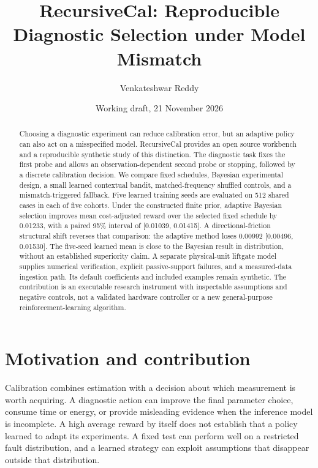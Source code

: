 \documentclass[
  10pt,
]{article}
\title{RecursiveCal: Reproducible Diagnostic Selection under Model
Mismatch}
\author{Venkateshwar Reddy}
\date{Working draft, 21 November 2026}
\begin{document}
\maketitle
\begin{abstract}
Choosing a diagnostic experiment can reduce calibration error, but an
adaptive policy can also act on a misspecified model. RecursiveCal
provides an open source workbench and a reproducible synthetic study of
this distinction. The diagnostic task fixes the first probe and allows
an observation-dependent second probe or stopping, followed by a
discrete calibration decision. We compare fixed schedules, Bayesian
experimental design, a small learned contextual bandit,
matched-frequency shuffled controls, and a mismatch-triggered fallback.
Five learned training seeds are evaluated on 512 shared cases in each of
five cohorts. Under the constructed finite prior, adaptive Bayesian
selection improves mean cost-adjusted reward over the selected fixed
schedule by 0.01233, with a paired 95\% interval of {[}0.01039,
0.01415{]}. A directional-friction structural shift reverses that
comparison: the adaptive method loses 0.00992 {[}0.00496, 0.01530{]}.
The five-seed learned mean is close to the Bayesian result in
distribution, without an established superiority claim. A separate
physical-unit liftgate model supplies numerical verification, explicit
passive-support failures, and a measured-data ingestion path. Its
default coefficients and included examples remain synthetic. The
contribution is an executable research instrument with inspectable
assumptions and negative controls, not a validated hardware controller
or a new general-purpose reinforcement-learning algorithm.
\end{abstract}

\section{Motivation and contribution}\label{motivation-and-contribution}

Calibration combines estimation with a decision about which measurement
is worth acquiring. A diagnostic action can improve the final parameter
choice, consume time or energy, or provide misleading evidence when the
inference model is incomplete. A high average reward by itself does not
establish that a policy learned to adapt its experiments. A fixed test
can perform well on a restricted fault distribution, and a learned
strategy can exploit assumptions that disappear outside that
distribution.
\end{document}
